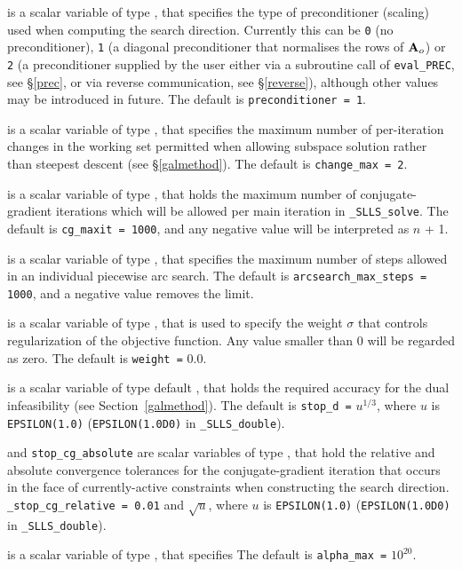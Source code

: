 \documentclass{galahad}
\newcommand{\packagename}{SLLS}
\newcommand{\fullpackagename}{\libraryname\_\packagename}
\newcommand{\solver}{{\tt \fullpackagename\_solve}}
\begin{document}
\begin{description}
 is a scalar variable of type \integer, that
specifies the type of preconditioner (scaling) used when computing the
search direction. Currently this can be 
{\tt 0} (no preconditioner), 
{\tt 1} (a diagonal preconditioner that normalises the rows of ${\mathbf{A}}_o$) or
{\tt 2} (a preconditioner supplied by the user either via a subroutine
call of {\tt eval\_PREC}, see \S\ref{prec}, or via reverse communication, 
see \S\ref{reverse}),
although other values may be introduced
in future. The default is {\tt preconditioner = 1}.

 is a scalar variable of type \integer, that
specifies the maximum number of per-iteration changes in the working set
permitted when allowing subspace solution rather than steepest descent
(see \S\ref{galmethod}).
The default is {\tt change\_max = 2}.

 is a scalar variable of type \integer, that holds the
maximum number of conjugate-gradient iterations which will be allowed
per main iteration in \solver.
The default is {\tt cg\_maxit = 1000}, and any negative value will
be interpreted as $n$ + 1.

 is a scalar variable of type \integer,
that specifies the maximum number of steps allowed in an individual
piecewise arc search.
The default is {\tt arcsearch\_max\_steps = 1000}, and a negative value
removes the limit.

 is a scalar variable of type \realdp, that is used to
specify the weight $\sigma$ that controls regularization of the objective 
function. Any value smaller than $0$ will be regarded as zero.
The default is {\tt weight =} $0.0$.

 is a scalar variable of type default
\realdp, that holds the
required accuracy for the dual infeasibility (see Section~\ref{galmethod}).
The default is {\tt stop\_d =} $u^{1/3}$,
where $u$ is {\tt EPSILON(1.0)} ({\tt EPSILON(1.0D0)} in
{\tt \fullpackagename\_double}).

 and {\tt stop\_cg\_absolute}
are scalar variables of type \realdp,
that hold the relative and absolute convergence tolerances for the
conjugate-gradient iteration that occurs in the face of currently-active
constraints when constructing the search direction.
{\tt \_stop\_cg\_relative = 0.01}
and  $\sqrt{u}$,
where $u$ is {\tt EPSILON(1.0)} ({\tt EPSILON(1.0D0)} in
{\tt \fullpackagename\_double}).

 is a scalar variable of type \realdp, that specifies
The default is {\tt alpha\_max =} $10^{20}$.


\end{description}
\end{document}
